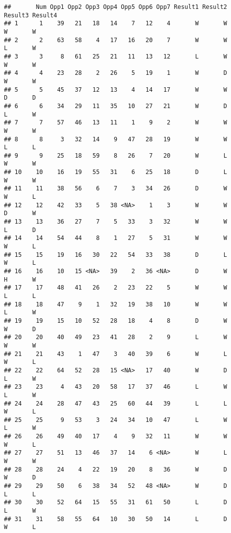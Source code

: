 \documentclass[
]{article}
\begin{document}
\begin{verbatim}
##       Num Opp1 Opp2 Opp3 Opp4 Opp5 Opp6 Opp7 Result1 Result2 Result3 Result4
## 1      1    39   21   18   14    7   12    4       W       W       W       W
## 2      2    63   58    4   17   16   20    7       W       W       L       W
## 3      3     8   61   25   21   11   13   12       L       W       W       W
## 4      4    23   28    2   26    5   19    1       W       D       W       W
## 5      5    45   37   12   13    4   14   17       W       W       D       D
## 6      6    34   29   11   35   10   27   21       W       D       L       W
## 7      7    57   46   13   11    1    9    2       W       W       W       W
## 8      8     3   32   14    9   47   28   19       W       W       L       L
## 9      9    25   18   59    8   26    7   20       W       L       W       W
## 10    10    16   19   55   31    6   25   18       D       L       W       W
## 11    11    38   56    6    7    3   34   26       D       W       W       L
## 12    12    42   33    5   38 <NA>    1    3       W       W       D       W
## 13    13    36   27    7    5   33    3   32       W       W       L       D
## 14    14    54   44    8    1   27    5   31       W       W       W       L
## 15    15    19   16   30   22   54   33   38       D       L       W       L
## 16    16    10   15 <NA>   39    2   36 <NA>       D       W       H       W
## 17    17    48   41   26    2   23   22    5       W       W       L       L
## 18    18    47    9    1   32   19   38   10       W       W       L       W
## 19    19    15   10   52   28   18    4    8       D       W       W       D
## 20    20    40   49   23   41   28    2    9       L       W       W       W
## 21    21    43    1   47    3   40   39    6       W       L       W       L
## 22    22    64   52   28   15 <NA>   17   40       W       D       L       W
## 23    23     4   43   20   58   17   37   46       L       W       L       W
## 24    24    28   47   43   25   60   44   39       L       L       W       L
## 25    25     9   53    3   24   34   10   47       L       W       L       W
## 26    26    49   40   17    4    9   32   11       W       W       W       L
## 27    27    51   13   46   37   14    6 <NA>       W       L       W       W
## 28    28    24    4   22   19   20    8   36       W       D       W       D
## 29    29    50    6   38   34   52   48 <NA>       W       D       L       L
## 30    30    52   64   15   55   31   61   50       L       D       L       W
## 31    31    58   55   64   10   30   50   14       L       D       W       L

\end{verbatim}
\end{document}
